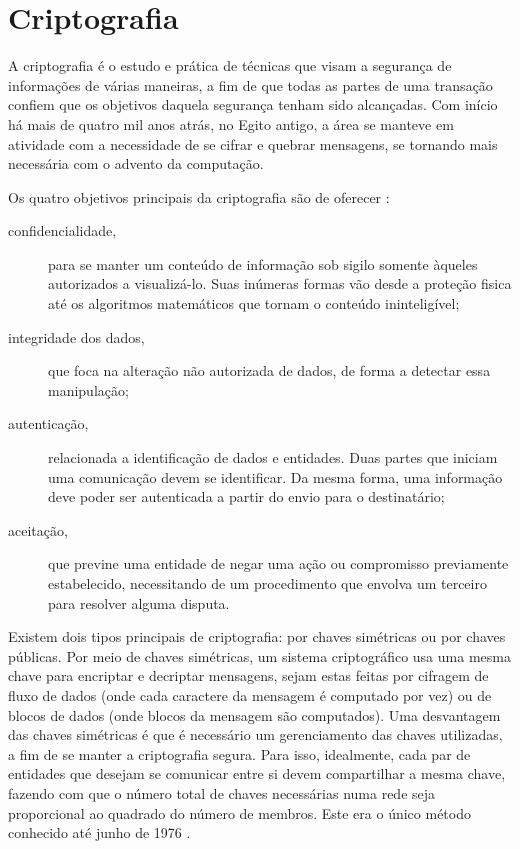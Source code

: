 
\section{Criptografia}

A criptografia é o estudo e prática de técnicas que visam a segurança de informações de
várias maneiras, a fim de que todas as partes de uma transação confiem que os objetivos
daquela segurança tenham sido alcançadas. Com início há mais de quatro mil anos atrás,
no Egito antigo, a área se manteve em atividade com a necessidade de se cifrar e
quebrar mensagens, se tornando mais necessária com o advento da computação.

Os quatro objetivos principais da criptografia são de oferecer
\cite{book:applied-crypto}:

\begin{description}
    \item[confidencialidade,] para se manter um conteúdo de informação sob sigilo
        somente àqueles autorizados a visualizá-lo. Suas inúmeras formas vão desde a
        proteção fisica até os algoritmos matemáticos que tornam o conteúdo
        ininteligível;

    \item[integridade dos dados,] que foca na alteração não autorizada de dados, de
        forma a detectar essa manipulação;

    \item[autenticação,] relacionada a identificação de dados e entidades. Duas partes
        que iniciam uma comunicação devem se identificar. Da mesma forma, uma
        informação deve poder ser autenticada a partir do envio para o destinatário;

    \item[aceitação,] que previne uma entidade de negar uma ação ou compromisso
        previamente estabelecido, necessitando de um procedimento que envolva um
        terceiro para resolver alguma disputa.
\end{description}

Existem dois tipos principais de criptografia: por chaves simétricas ou por chaves
públicas. Por meio de chaves simétricas, um sistema criptográfico usa uma mesma chave
para encriptar e decriptar mensagens, sejam estas feitas por cifragem de fluxo de dados
(onde cada caractere da mensagem é computado por vez) ou de blocos de dados (onde blocos
da mensagem são computados). Uma desvantagem das chaves simétricas \cite{wiki:crypto} é
que é necessário um gerenciamento das chaves utilizadas, a fim de se manter a
criptografia segura. Para isso, idealmente, cada par de entidades que desejam se
comunicar entre si devem compartilhar a mesma chave, fazendo com que o número total de
chaves necessárias numa rede seja proporcional ao quadrado do número de membros. Este
era o único método conhecido até junho de 1976 \cite{artigo:diffiehellman}.

